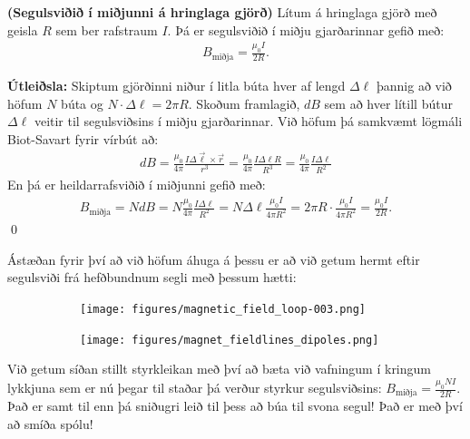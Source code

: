 \vspace{1.5cm}

\begin{tcolorbox}
\begin{theorem}
\textbf{(Segulsviðið í miðjunni á hringlaga gjörð)} Lítum á hringlaga gjörð með geisla $R$ sem ber rafstraum $I$. Þá er segulsviðið í miðju gjarðarinnar gefið með:
\begin{align*}
    B_{\text{miðja}} = \frac{\mu_0 I}{2R}.
\end{align*}
\end{theorem}
\end{tcolorbox}


\textbf{Útleiðsla:} Skiptum gjörðinni niður í litla búta hver af lengd $\Delta \ell$ þannig að við höfum $N$ búta og $N \cdot \Delta \ell = 2\pi R$. Skoðum framlagið, $dB$ sem að hver lítill bútur $\Delta \ell$ veitir til segulsviðsins í miðju gjarðarinnar. Við höfum þá samkvæmt lögmáli Biot-Savart fyrir vírbút að:
\begin{align*}
    dB = \frac{\mu_0}{4\pi} \frac{I \Delta \vec{\ell} \times \vec{r}}{r^3} = \frac{\mu_0}{4\pi} \frac{I \Delta \ell R}{R^3} = \frac{\mu_0}{4\pi} \frac{I \Delta \ell}{R^2}
\end{align*}
En þá er heildarrafsviðið í miðjunni gefið með:
\begin{align*}
    B_{\text{miðja}} = N dB = N \frac{\mu_0}{4\pi} \frac{I \Delta \ell}{R^2} = N \Delta \ell \frac{\mu_0 I}{4\pi R^2} = 2\pi R \cdot \frac{\mu_0 I}{4\pi R^2} = \frac{\mu_0 I}{2 R}.
\end{align*}
\qed

Ástæðan fyrir því að við höfum áhuga á þessu er að við getum hermt eftir segulsviði frá hefðbundnum segli með þessum hætti:


\begin{figure}[H]
    \centering
\begin{subfigure}[h]{.4\textwidth}
    \texttt{[image: figures/magnetic\_field\_loop-003.png]}
\end{subfigure}
\hfill
\begin{subfigure}[h]{.4\textwidth}
    \centering
    \texttt{[image: figures/magnet\_fieldlines\_dipoles.png]}
\end{subfigure}
\end{figure}


Við getum síðan stillt styrkleikan með því að bæta við vafningum í kringum lykkjuna sem er nú þegar til staðar þá verður styrkur segulsviðsins: $B_{\text{miðja}} = \frac{\mu_0 N I}{2 R}$. Það er samt til enn þá sniðugri leið til þess að búa til svona segul! Það er með því að smíða spólu!


